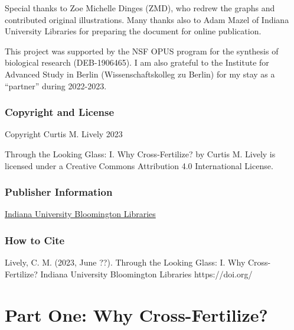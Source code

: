 \documentclass[
  letterpaper,
]{book}
\begin{document}
Special thanks to Zoe Michelle Dinges (ZMD), who redrew the graphs and
contributed original illustrations. Many thanks also to Adam Mazel of
Indiana University Libraries for preparing the document for online
publication.

This project was supported by the NSF OPUS program for the synthesis of
biological research (DEB-1906465). I am also grateful to the Institute
for Advanced Study in Berlin (Wissenschaftskolleg zu Berlin) for my stay
as a ``partner'' during 2022-2023.

\hypertarget{copyright-and-license}{%
\section*{Copyright and License}\label{copyright-and-license}}


Copyright Curtis M. Lively 2023

{Through the Looking Glass: I. Why Cross-Fertilize?} by Curtis M. Lively
is licensed under a Creative Commons Attribution 4.0 International
License.

\hypertarget{publisher-information}{%
\section*{Publisher Information}\label{publisher-information}}


\href{https://libraries.indiana.edu/}{Indiana University Bloomington
Libraries}

\hypertarget{how-to-cite}{%
\section*{How to Cite}\label{how-to-cite}}


Lively, C. M. (2023, June ??). Through the Looking Glass: I. Why
Cross-Fertilize? Indiana University Bloomington Libraries
https://doi.org/

\part{Part One: Why Cross-Fertilize?}
\end{document}
